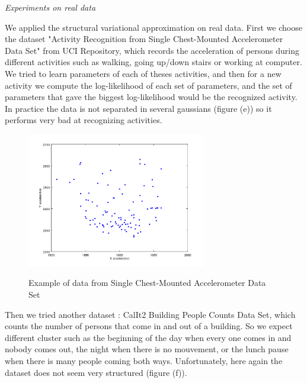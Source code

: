 \documentclass[10pt,a4paper]{report}
\begin{document}
\clearpage
\begin{center}
\end{center}
\vspace{80pt}
\begin{center}
\Huge{\textit{Experiments on real data}}
\end{center}
\vspace{20pt}

We applied the structural variational approximation on real data. First we choose the dataset "Activity Recognition from Single Chest-Mounted Accelerometer Data Set" from UCI Repository, which records the acceleration of persons during different activities such as walking, going up/down stairs or working at computer. We tried to learn parameters of each of theses activities, and then for a new activity we compute the log-likelihood of each set of parameters, and the set of parameters that gave the biggest log-likelihood would be the recognized activity. In practice the data is not separated in several gaussians (figure (e)) so it performs very bad at recognizing activities.

\begin{figure}[h]
	\centering
	\includegraphics[width=0.7\textwidth]{standing.png}
	\centerline{\Large{Example of data from Single Chest-Mounted Accelerometer Data Set}}
	\label{fig:e}
\end{figure}

\newpage
Then we tried another dataset : CalIt2 Building People Counts Data Set, which counts the number of persons that come in and out of a building. So we expect different cluster such as the beginning of the day when every one comes in and nobody comes out, the night when there is no mouvement, or the lunch pause when there is many people coming both ways. Unfortunately, here again the dataset does not seem very structured (figure (f)).
\end{document}
